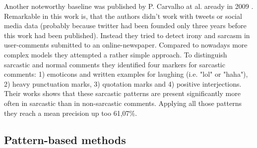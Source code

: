 \documentclass[sigconf,  review=false, nonacm=true]{acmart}
\begin{document}
Another noteworthy baseline was published by P. Carvalho at al. aready in 2009 \cite{Clues-for-Detecting-Irony-in-User-Generated-Contents}. Remarkable in this work is, that the authors didn't work with tweets or social media data (probably because twitter had been founded only three years before this work had been published). Instead they tried to detect irony and sarcasm in user-comments submitted to an online-newspaper. 
Compared to nowadays more complex models they attempted a rather simple approach. To distinguish sarcastic and normal comments they identified four markers for sarcastic comments: 1) emoticons and written examples for laughing (i.e. "lol" or "haha"), 2) heavy punctuation marks, 3) quotation marks and 4) positive interjections.
Their works shows that these sarcastic patterns are present significantly more often in sarcastic than in non-sarcastic comments. Applying all those patterns they reach a mean precision up too 61,07\%.


\subsection{Pattern-based methods}
\end{document}

